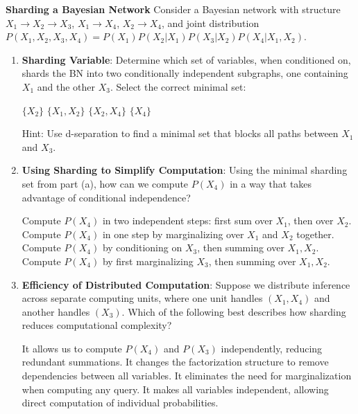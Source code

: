 \documentclass[12pt,letterpaper, onecolumn]{exam}
\begin{document}
\begin{questions}
\clearpage
\question[20 points]\textbf{Sharding a Bayesian Network}\droppoints
Consider a Bayesian network with structure \( X_1 \to X_2 \to X_3 \), \( X_1 \to X_4 \), \( X_2 \to X_4 \), and joint distribution \( P(X_1, X_2, X_3, X_4) = P(X_1) P(X_2 | X_1) P(X_3 | X_2) P(X_4 | X_1, X_2) \).

\begin{enumerate}[label=(\alph*)]
    \item \textbf{Sharding Variable}: Determine which set of variables, when conditioned on, shards the BN into two conditionally independent subgraphs, one containing \( X_1 \) and the other \( X_3 \). Select the correct minimal set: 
    \begin{choices}
        \choice \( \{X_2\} \)
        \choice \( \{X_1, X_2\} \)
        \choice \( \{X_2, X_4\} \)
        \choice \( \{X_4\} \)
    \end{choices}
    Hint: Use d-separation to find a minimal set that blocks all paths between \( X_1 \) and \( X_3 \).

    \item \textbf{Using Sharding to Simplify Computation}:  
    Using the minimal sharding set from part (a), how can we compute \( P(X_4) \) in a way that takes advantage of conditional independence?  
    \begin{choices}
        \choice Compute \( P(X_4) \) in two independent steps: first sum over \( X_1 \), then over \( X_2 \).
        \choice Compute \( P(X_4) \) in one step by marginalizing over \( X_1 \) and \( X_2 \) together.
        \choice Compute \( P(X_4) \) by conditioning on \( X_3 \), then summing over \( X_1, X_2 \).
        \choice Compute \( P(X_4) \) by first marginalizing \( X_3 \), then summing over \( X_1, X_2 \).
    \end{choices}
    \item \textbf{Efficiency of Distributed Computation}:  
    Suppose we distribute inference across separate computing units, where one unit handles \( (X_1, X_4) \) and another handles \( (X_3) \).  
    Which of the following best describes how sharding reduces computational complexity?
    \begin{choices}
        \choice It allows us to compute \( P(X_4) \) and \( P(X_3) \) independently, reducing redundant summations.
        \choice It changes the factorization structure to remove dependencies between all variables.
        \choice It eliminates the need for marginalization when computing any query.
        \choice It makes all variables independent, allowing direct computation of individual probabilities.
    \end{choices}
\end{enumerate}


\end{questions}
\end{document}
